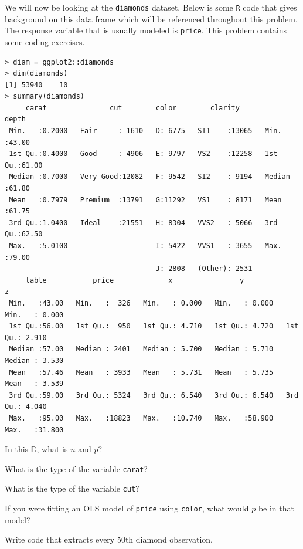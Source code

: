 \documentclass[12pt]{article}
\begin{document}
\problem We will now be looking at the \texttt{diamonds} dataset. Below is some \texttt{R} code that gives background on this data frame which will be referenced throughout this problem. The response variable that is usually modeled is \texttt{price}. This problem contains some coding exercises. 

\lstset{basicstyle=\scriptsize}
\begin{lstlisting}
> diam = ggplot2::diamonds
> dim(diamonds)
[1] 53940    10
> summary(diamonds)
     carat               cut        color        clarity          depth      
 Min.   :0.2000   Fair     : 1610   D: 6775   SI1    :13065   Min.   :43.00  
 1st Qu.:0.4000   Good     : 4906   E: 9797   VS2    :12258   1st Qu.:61.00  
 Median :0.7000   Very Good:12082   F: 9542   SI2    : 9194   Median :61.80  
 Mean   :0.7979   Premium  :13791   G:11292   VS1    : 8171   Mean   :61.75  
 3rd Qu.:1.0400   Ideal    :21551   H: 8304   VVS2   : 5066   3rd Qu.:62.50  
 Max.   :5.0100                     I: 5422   VVS1   : 3655   Max.   :79.00  
                                    J: 2808   (Other): 2531                  
     table           price             x                y                z         
 Min.   :43.00   Min.   :  326   Min.   : 0.000   Min.   : 0.000   Min.   : 0.000  
 1st Qu.:56.00   1st Qu.:  950   1st Qu.: 4.710   1st Qu.: 4.720   1st Qu.: 2.910  
 Median :57.00   Median : 2401   Median : 5.700   Median : 5.710   Median : 3.530  
 Mean   :57.46   Mean   : 3933   Mean   : 5.731   Mean   : 5.735   Mean   : 3.539  
 3rd Qu.:59.00   3rd Qu.: 5324   3rd Qu.: 6.540   3rd Qu.: 6.540   3rd Qu.: 4.040  
 Max.   :95.00   Max.   :18823   Max.   :10.740   Max.   :58.900   Max.   :31.800
\end{lstlisting}

\lstset{basicstyle=\footnotesize}

\benum

 In this $\mathbb{D}$, what is $n$ and $p$? 

 What is the type of the variable \texttt{carat}? 

 What is the type of the variable \texttt{cut}? 

 If you were fitting an OLS model of \texttt{price} using \texttt{color}, what would $p$ be in that model? 

 Write code that extracts every 50th diamond observation. 
\end{document}
